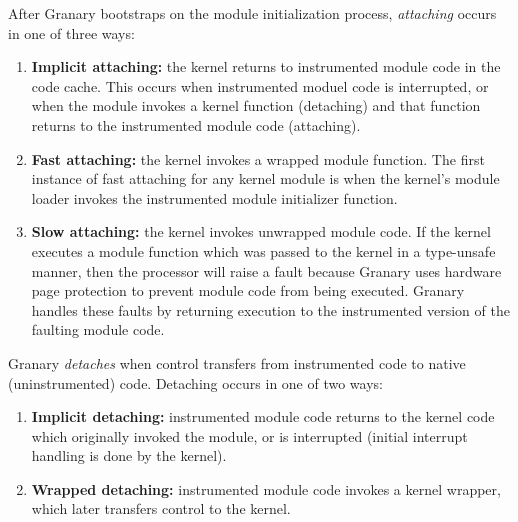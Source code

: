 \documentclass[preprint]{sigplanconf}
\begin{document}
After Granary bootstraps on the module initialization process, \emph{attaching} occurs in one of three ways: \begin{enumerate}
	\item {\bf Implicit attaching:} the kernel returns to instrumented module code in the code cache. This occurs when instrumented moduel code is interrupted, or when the module invokes a kernel function (detaching) and that function returns to the instrumented module code (attaching).
	\item {\bf Fast attaching:} the kernel invokes a wrapped module function. The first instance of fast attaching for any kernel module is when the kernel's module loader invokes the instrumented module initializer function.
	\item {\bf Slow attaching:} the kernel invokes unwrapped module code. If the kernel executes a module function which was passed to the kernel in a type-unsafe manner, then the processor will raise a fault because Granary uses hardware page protection to prevent module code from being executed. Granary handles these faults by returning execution to the instrumented version of the faulting module code.
\end{enumerate}

Granary \emph{detaches} when control transfers from instrumented code to native (uninstrumented) code. Detaching occurs in one of two ways: \begin{enumerate}
	\item {\bf Implicit detaching:} instrumented module code returns to the kernel code which originally invoked the module, or is interrupted (initial interrupt handling is done by the kernel).
	\item {\bf Wrapped detaching:} instrumented module code invokes a kernel wrapper, which later transfers control to the kernel.
\end{enumerate}
\end{document}
